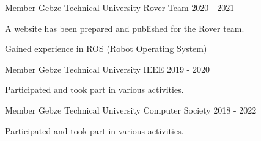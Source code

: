 

\begin{cventries}

  \cventry
    {Member} %
    {Gebze Technical University Rover Team} %
    { } %
    {2020 - 2021} %
    {
      \begin{cvitems} %
        \item {A website has been prepared and published for the Rover team.}
        \item {Gained experience in ROS (Robot Operating System)}
      \end{cvitems}
    }

  \cventry
    {Member} %
    {Gebze Technical University IEEE} %
    { } %
    {2019 - 2020} %
    {
      \begin{cvitems} %
        \item {Participated and took part in various activities.}
      \end{cvitems}
    }

  \cventry
    {Member} %
    {Gebze Technical University Computer Society} %
    { } %
    {2018 - 2022} %
    {
      \begin{cvitems} %
        \item {Participated and took part in various activities.}
      \end{cvitems}
    }

\end{cventries}
